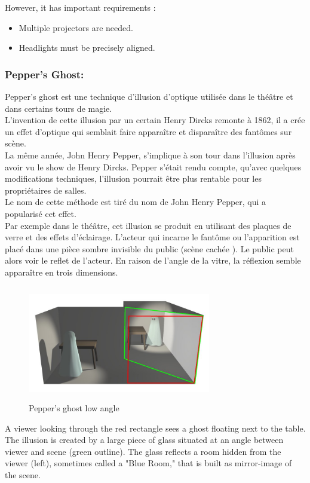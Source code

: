 However, it has important requirements : 
\begin{itemize}
\item Multiple projectors are needed.
\item Headlights must be precisely aligned.
\end{itemize}


\subsubsection{Pepper's Ghost:}
Pepper's ghost est une technique d'illusion d'optique utilisée dans le théâtre et dans certains tours de magie.\\
L'invention de cette illusion par un certain Henry Dircks remonte à 1862, il a crée un effet d'optique qui semblait faire apparaître et disparaître des fantômes sur scène.\\
La même année, John Henry Pepper, s'implique à son tour dans l'illusion après avoir vu le show de Henry Dircks. Pepper s'était rendu compte, qu'avec quelques modifications techniques, l'illusion pourrait être plus rentable pour les propriétaires de salles.\\
Le nom de cette méthode est tiré du nom de John Henry Pepper, qui a popularisé cet effet.\\
Par exemple dans le théâtre, cet illusion se produit en utilisant des plaques de verre et des effets d’éclairage. L'acteur qui incarne le fantôme ou l’apparition est placé dans une pièce sombre invisible du public (scène cachée ).
Le public peut alors voir le reflet de l'acteur. En raison de l'angle de la vitre, la réflexion semble apparaître en trois dimensions. 

\begin{figure}[h!]
\centering\includegraphics[width=8cm,height=5cm]{image/Peppers1.jpg}
\caption{Pepper's ghost low angle\cite{Peppers-ghost}}
\label{fig:paraba}
\end{figure}
A viewer looking through the red rectangle sees a ghost floating next to the table. The illusion is created by a large piece of glass situated at an angle between viewer and scene (green outline). The glass reflects a room hidden from the viewer (left), sometimes called a "Blue Room," that is built as mirror-image of the scene.\cite{Peppers-ghost}

